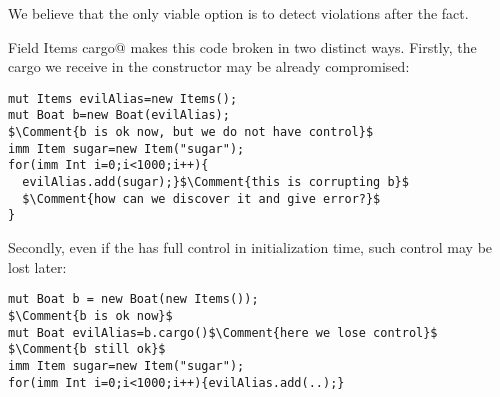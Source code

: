 We believe that the only viable option is to detect violations after the fact.


Field \Q@mut Items cargo@ makes this code
broken in two distinct ways. Firstly, the cargo we receive in the constructor may
be already compromised:
\saveSpace
\begin{lstlisting}
mut Items evilAlias=new Items();
mut Boat b=new Boat(evilAlias);
$\Comment{b is ok now, but we do not have control}$
imm Item sugar=new Item("sugar");
for(imm Int i=0;i<1000;i++){
  evilAlias.add(sugar);}$\Comment{this is corrupting b}$
  $\Comment{how can we discover it and give error?}$
}
\end{lstlisting}
\saveSpace 
Secondly, even if the \Q@Boat@ has full control 
in initialization time, such control may be lost later:
\saveSpace
\begin{lstlisting}
mut Boat b = new Boat(new Items());
$\Comment{b is ok now}$
mut Boat evilAlias=b.cargo()$\Comment{here we lose control}$
$\Comment{b still ok}$
imm Item sugar=new Item("sugar");
for(imm Int i=0;i<1000;i++){evilAlias.add(..);}
\end{lstlisting}
\saveSpace



